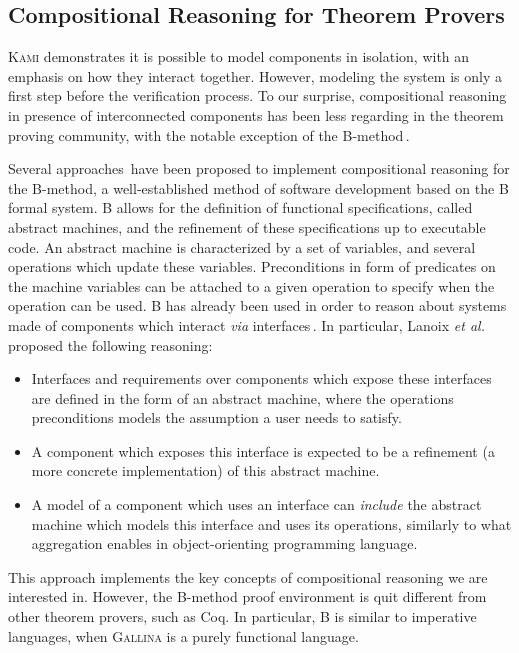 \subsection{Compositional Reasoning for Theorem Provers}
\label{subsec:sota:peff}

{\scshape Kami} demonstrates it is possible to model components in isolation,
with an emphasis on how they interact together.
%
However, modeling the system is only a first step before the verification
process.
%
To our surprise, compositional reasoning in presence of interconnected
components has been less regarding in the theorem proving community, with the
notable exception of the B-method\,\cite{abrial2005b}.

Several
approaches\,\cite{souquieres2005verifying,chouali2006proving,lanoix:hal-00105041}
have been proposed to implement compositional reasoning for the B-method, a
well-established method of software development based on the B formal system.
%
B allows for the definition of functional specifications, called abstract
machines, and the refinement of these specifications up to executable code.
%
An abstract machine is characterized by a set of variables, and several
operations which update these variables. Preconditions in form of predicates on
the machine variables can be attached to a given operation to specify when the
operation can be used.
%
B has already been used in order to reason about systems made of components
which interact \emph{via}
interfaces\,\cite{souquieres2005verifying,chouali2006proving,lanoix:hal-00105041}.
%
In particular, Lanoix \emph{et al.}\,\cite{lanoix:hal-00105041} proposed the
following reasoning:
%
\begin{itemize}
\item Interfaces and requirements over components which expose these interfaces
  are defined in the form of an abstract machine, where the operations
  preconditions models the assumption a user needs to satisfy.
\item A component which exposes this interface is expected to be a refinement (a
  more concrete implementation) of this abstract machine.
\item A model of a component which uses an interface can \emph{include} the
  abstract machine which models this interface and uses its operations,
  similarly to what aggregation enables in object-orienting programming
  language.
\end{itemize}

This approach implements the key concepts of compositional reasoning we are
interested in.
%
However, the B-method proof environment is quit different from other theorem
provers, such as Coq.
%
In particular, B is similar to imperative languages, when {\scshape Gallina} is
a purely functional language.

